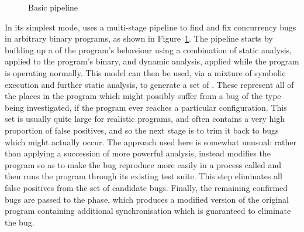 \begin{figure}
\begin{center}
  \caption{Basic pipeline}
\end{center}
\label{fig:basic_pipeline}
\end{figure}

In its simplest mode, \technique{} uses a multi-stage pipeline to find
and fix concurrency bugs in arbitrary binary programs, as shown in
Figure~\ref{fig:basic_pipeline}.  The pipeline starts by building up a
 of the program's behaviour using a combination of
static analysis, applied to the program's binary, and dynamic
analysis, applied while the program is operating normally.  This model
can then be used, via a mixture of symbolic execution and further
static analysis, to generate a set of .  These
represent all of the places in the program which might possibly suffer
from a bug of the type being investigated, if the program ever reaches
a particular configuration.  This set is usually quite large for
realistic programs, and often contains a very high proportion of false
positives, and so the next stage is to trim it back to bugs which
might actually occur.  The approach used here is somewhat unusual:
rather than applying a succession of more powerful analysis,
{\technique} instead modifies the program so as to make the bug
reproduce more easily in a process called
 and then runs the
program through its existing test suite.  This step eliminates all
false positives from the set of candidate bugs.  Finally, the
remaining confirmed bugs are passed to the 
phase, which produces a modified version of the original program
containing additional synchronisation which is guaranteed to eliminate
the bug.


